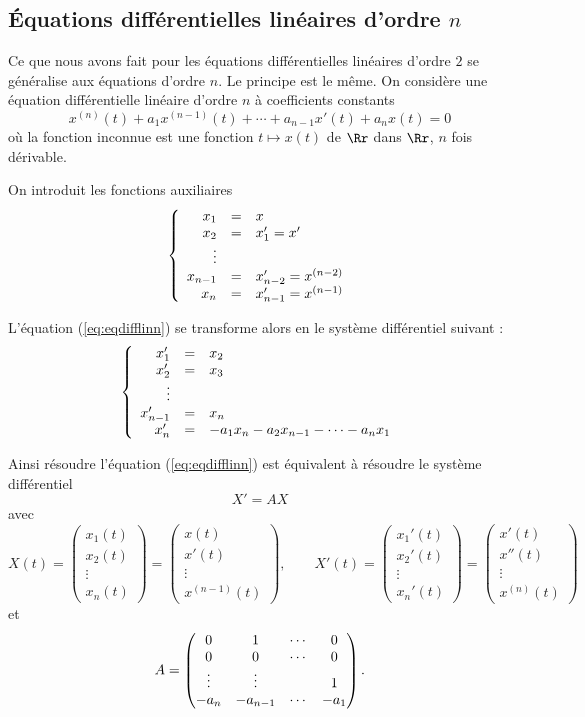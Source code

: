 \documentclass[12pt, class=report,crop=false]{standalone}
\begin{document}
\subsection{\'Equations différentielles linéaires d'ordre $n$}

Ce que nous avons fait pour les équations différentielles linéaires d'ordre $2$ se généralise 
aux équations d'ordre $n$.
Le principe est le même. 
On considère une équation différentielle linéaire d'ordre $n$ à coefficients constants
\begin{equation}
x^{(n)}(t) + a_1x^{(n-1)}(t) + \cdots+ a_{n-1}x'(t) + a_n x(t)=0
\label{eq:eqdifflinn}\tag{$E$}
\end{equation}
où la fonction inconnue est une fonction $t \mapsto x(t)$ de $\Rr$ dans $\Rr$, $n$ fois dérivable.



On introduit les fonctions auxiliaires
$$
\left\{\begin{array}{rcl}
x_1 &=& x\cr 
x_2 &=& x_1' =x'\cr
\vdots && \cr 
x_{n-1} &=& x'_{n-2}=x^{(n-2)}\cr
x_n &=&x'_{n-1}=x^{(n-1)}
\end{array}\right.$$

L'équation (\ref{eq:eqdifflinn}) se transforme alors en le système différentiel suivant :
$$
\left\{\begin{array}{rcl}
x'_1 &=& x_2\cr 
x'_2 &=& x_3\cr
\vdots&& \cr 
x'_{n-1} &=& x_{n}\cr 
x'_n &=& -a_1x_n-a_2x_{n-1}-\cdots-a_nx_1
\end{array}\right.$$


Ainsi résoudre l'équation (\ref{eq:eqdifflinn}) est équivalent à résoudre le système différentiel
$$X'=AX$$
avec
$$
X(t) = \begin{pmatrix} x_1(t) \\ x_2(t) \\ \vdots \\ x_n(t) \end{pmatrix}
= \begin{pmatrix} x(t) \\ x'(t) \\ \vdots \\ x^{(n-1)}(t) \end{pmatrix},
\qquad
X'(t) = \begin{pmatrix} x_1'(t) \\ x_2'(t) \\ \vdots \\ x_n'(t) \end{pmatrix}
= \begin{pmatrix} x'(t) \\ x''(t) \\ \vdots \\ x^{(n)}(t) \end{pmatrix}
$$
et
$$
A=\begin{pmatrix}
0&1&\cdots&0\cr
0&0&\cdots&0\cr
\vdots&\vdots& &1\cr
-a_n&-a_{n-1}&\cdots&-a_{1}
\end{pmatrix}.$$
\end{document}
